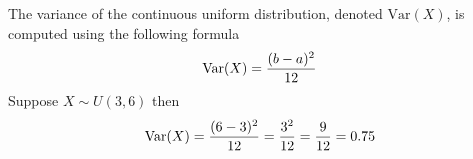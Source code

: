 \documentclass[a4paper,12pt]{article}
\begin{document}
%
%
%
%



\noindent The variance of the continuous uniform distribution, denoted $\textrm{Var}(X)$, is computed using the following formula
\[
\textrm{Var}(X) = {(b - a)^2 \over 12}
\]
Suppose $X \sim U(3,6)$ then
\[
\textrm{Var}(X) = {{(6 - 3)^2 \over 12} =  {3^2 \over 12} = {9 \over 12} = 0.75}
\]













\end{document}
